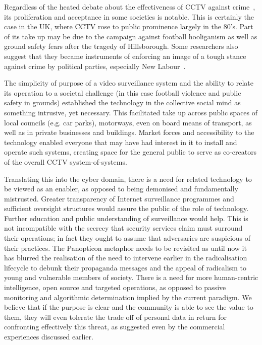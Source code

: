 \documentclass{llncs}
\begin{document}
Regardless of the heated debate about the effectiveness of CCTV against crime~\cite{Ditton,Woodhouse}, its proliferation and acceptance in some societies is notable. This is certainly the case in the UK, where CCTV rose to public prominence largely in the 80's. Part of its take up may be due to the campaign against football hooliganism as well as ground safety fears after the tragedy of Hillsborough. Some researchers also suggest that they became instruments of enforcing an image of a tough stance against crime by political parties, especially New Labour~\cite{McHill}.

The simplicity of purpose of a video surveillance system and the ability to relate its operation to a societal challenge (in this case football violence and public safety in grounds) established the technology in the collective social mind as something intrusive, yet necessary. This facilitated take up across public spaces of local councils (e.g. car parks), motorways, even on board means of transport, as well as in private businesses and buildings. Market forces and accessibility to the technology enabled everyone that may have had interest in it to install and operate such systems, creating space for the general public to serve as co-creators of the overall CCTV system-of-systems.

Translating this into the cyber domain, there is a need for related technology to be viewed as an enabler, as opposed to being demonised and fundamentally mistrusted. Greater transparency of Internet surveillance programmes and sufficient oversight structures would assure the public of the role of technology. Further education and public understanding of surveillance would help. This is not incompatible with the secrecy that security services claim must surround their operations; in fact they ought to assume that adversaries are suspicious of their practices. The Panopticon metaphor needs to be revisited as until now it has blurred the realisation of the need to intervene earlier in the radicalisation lifecycle to debunk their propaganda messages and the appeal of radicalism to young and vulnerable members of society. There is a need for more human-centric intelligence, open source and targeted operations, as opposed to passive monitoring and algorithmic determination implied by the current paradigm. We believe that if the purpose is clear and the community is able to see the value to them, they will even tolerate the trade off of personal data in return for confronting effectively this threat, as suggested even by the commercial experiences discussed earlier.
\end{document}
